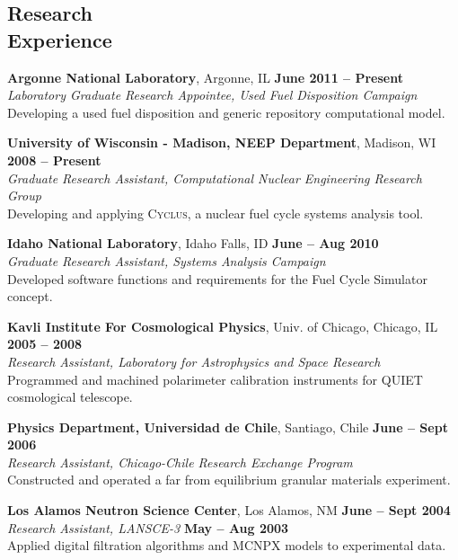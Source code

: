 \documentclass[margin,line]{resume}
\newcommand{\Cyclus}{\textsc{Cyclus}\xspace}
\begin{document}
\begin{resume}
    \section{\mysidestyle Research\\Experience}
    \textbf{Argonne National Laboratory}, Argonne, IL \hfill \textbf{June 2011 -- Present}\\
		\textsl{Laboratory Graduate Research Appointee, Used Fuel Disposition Campaign}\\ 
		Developing a used fuel disposition and generic repository computational model.  \vspace{-0.5mm}

    \textbf{University of Wisconsin - Madison, NEEP Department}, Madison, WI \hfill \textbf{2008 -- Present}\\
		\textsl{Graduate Research Assistant, Computational Nuclear Engineering Research Group}\\ 
		Developing and applying \Cyclus, a nuclear fuel cycle systems analysis tool.  \vspace{-0.5mm}

    \textbf{Idaho National Laboratory}, Idaho Falls, ID \hfill \textbf{June -- Aug 2010}\\
		\textsl{Graduate Research Assistant, Systems Analysis Campaign}\\ 
		Developed software functions and requirements for the Fuel Cycle Simulator concept.  \vspace{-0.5mm}

    \textbf{Kavli Institute For Cosmological Physics}, Univ. of Chicago, Chicago, IL \hfill \textbf{2005 -- 2008}\\
                \textsl{Research Assistant, Laboratory for Astrophysics and Space Research}\\
                Programmed and machined polarimeter calibration instruments for QUIET cosmological telescope.  \vspace{-0.5mm}

    \textbf{Physics Department, Universidad de Chile}, Santiago, Chile \hfill \textbf{June -- Sept 2006}\\
                \textsl{Research Assistant, Chicago-Chile Research Exchange Program}\\
                 Constructed and operated a far from equilibrium granular materials experiment.  \vspace{-0.5mm}

    \textbf{Los Alamos Neutron Science Center}, Los Alamos, NM \hfill \textbf{June -- Sept 2004}\\ 
                \textsl{Research Assistant, LANSCE-3} \hfill \textbf{May -- Aug 2003}\\
                Applied digital filtration algorithms and MCNPX models to experimental data.\vspace{-0.5mm}


\end{resume}
\end{document}
